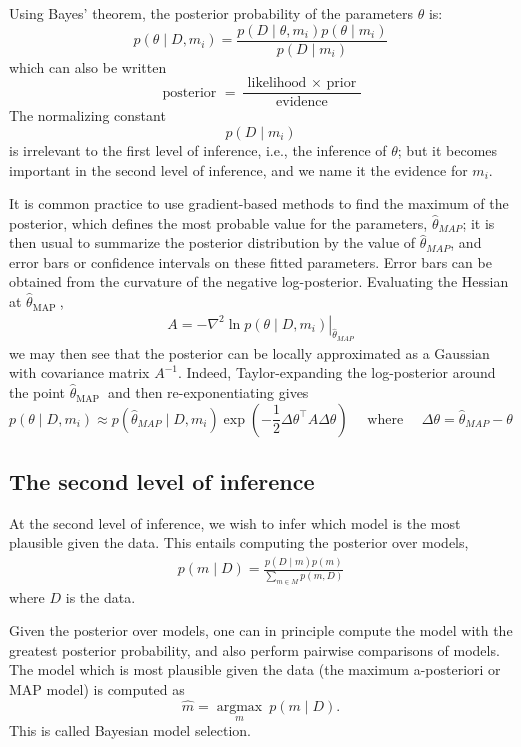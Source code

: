 \documentclass[11pt]{article}
\theoremstyle{plain} %
\theoremstyle{remark}
\begin{document}
Using Bayes' theorem, the posterior probability of the parameters
$\theta$ is:
$$
  p\left(\theta \mid D, m_{i}\right)=\frac{p\left(D \mid \theta, m_{i}\right) p\left(\theta \mid m_{i}\right)}{p\left(D \mid m_{i}\right)}
$$
which can also be written
$$
  \text { posterior }=\frac{\text { likelihood } \times \text { prior }}{\text { evidence }}
$$
The normalizing constant
$$
  p\left(D \mid m_{i}\right)
$$
is irrelevant to the first level of inference, i.e., the inference of $\theta$;
but it becomes important in the second level of inference, and we name it the
evidence for $m_{i}$.

It is common practice to use gradient-based methods to find the maximum
of the posterior, which defines the most probable value for the parameters,
$\hat{\theta}_{M A P}$; it is then usual to summarize the posterior
distribution by the value of $\hat{\theta}_{M A P}$, and error bars or
confidence intervals on these fitted parameters. Error bars can be obtained from the curvature of the negative
log-posterior. Evaluating the Hessian at $\hat{\theta}_{\text {MAP }}$,
\begin{align}
  A=-\left.\nabla^{2} \ln p\left(\theta \mid D, m_{i}\right)\right|_{\hat{\theta}_{M A P}}
  \label{eq:curvature of the negative
    log-posterior}
\end{align}
we may then see that the posterior can be locally approximated as a Gaussian
with covariance matrix $A^{-1}$. Indeed, Taylor-expanding the log-posterior around the point
$\hat{\theta}_{\text {MAP }}$ and then re-exponentiating gives
$$
  p\left(\theta \mid D, m_{i}\right) \approx p\left(\hat{\theta}_{M A P} \mid D, m_{i}\right) \exp \left(-\frac{1}{2} \Delta \theta^\top A \Delta \theta\right)
  \quad \text { where } \quad  \Delta \theta=\hat{\theta}_{M A P}-\theta
$$

\subsection{The second level of inference}
At the second level of inference, we wish to infer which model is the most
plausible given the data. This entails computing the posterior over models,
\begin{align}
  p(m \mid D)=\frac{p(D \mid m) p(m)}{\sum_{m \in M} p(m, D)}
  \label{eq:posterior over models}
\end{align}
where $D$ is the data.

Given the posterior over models, one can in principle compute the model
with the greatest posterior probability, and also perform pairwise comparisons
of models. The model which is most plausible given the data (the maximum
a-posteriori or MAP model) is computed as
$$
  \hat{m}=\underset{m}{\operatorname{argmax}} ~ p(m \mid D) .
$$
This is called {\color{C3}Bayesian model selection}.
\end{document}
